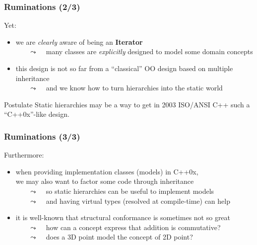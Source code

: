 \begin{frame}
  \frametitle{Ruminations (2/3)}

Yet:

\smallskip

  \begin{itemize}
  \item we are \textit{clearly} aware of \bfarrayiteratorT being an \textbf{Iterator} \\
    ~~~ {\scriptsize $\leadsto$ ~ many classes are \textit{explicitly} designed to model some domain concepts }\\
    \smallskip
  \item this design is not so far from a ``classical'' OO design based on multiple inheritance \\
    ~~~ {\scriptsize $\leadsto$ ~ and we know how to turn hierarchies into the static world }
  \end{itemize}

\smallskip

\begin{block}{Postulate}
  Static hierarchies may be a way to get in 2003 ISO/ANSI C++ such a ``C++0x''-like design.
\end{block}

\end{frame}




\begin{frame}
  \frametitle{Ruminations (3/3)}

Furthermore:
    \smallskip
  \begin{itemize}
  \item when providing implementation classes (models) in C++0x, \\
    we may also want to factor some code through inheritance \\
    ~~~ {\scriptsize $\leadsto$ ~ so static hierarchies can be useful to implement models }\\
    ~~~ {\scriptsize $\leadsto$ ~ and having virtual types (resolved at compile-time) can help }
    \smallskip
  \item it is well-known that structural conformance is sometimes not so great \\
    ~~~ {\scriptsize $\leadsto$ ~ how can a concept express that addition is commutative? }\\
    ~~~ {\scriptsize $\leadsto$ ~ does a 3D point model the concept of 2D point? }
  \end{itemize}

\end{frame}



